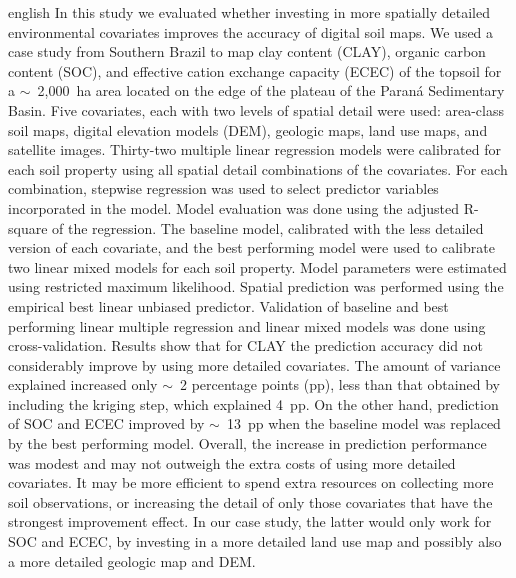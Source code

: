 \begin{chapterabstract}{english}{\englishkeys}
In this study we evaluated whether investing in more spatially detailed 
environmental covariates improves the accuracy of digital soil maps. We used a 
case study from Southern Brazil to map clay content (CLAY), organic carbon 
content (SOC), and effective cation exchange capacity (ECEC) of the topsoil for
a $\sim$~2,000~ha area located on the edge of the plateau of the Paraná 
Sedimentary Basin. Five covariates, each with two levels of spatial detail were
used: area-class soil maps, digital elevation models (DEM), geologic maps, land
use maps, and satellite images. Thirty-two multiple linear regression models 
were calibrated for each soil property using all spatial detail combinations of
the covariates. For each combination, stepwise regression was used to select 
predictor variables incorporated in the model. Model evaluation was done using 
the adjusted R-square of the regression. The baseline model, calibrated with the
less detailed version of each covariate, and the best performing model were used
to calibrate two linear mixed models for each soil property. Model parameters 
were estimated using restricted maximum likelihood. Spatial prediction was 
performed using the empirical best linear unbiased predictor. Validation of 
baseline and best performing linear multiple regression and linear mixed models
was done using cross-validation. Results show that for CLAY the prediction 
accuracy did not considerably improve by using more detailed covariates. The 
amount of variance explained increased only $\sim$~2 percentage points (pp), 
less than that obtained by including the kriging step, which explained 4~pp. On
the other hand, prediction of SOC and ECEC improved by $\sim$~13~pp when the 
baseline model was replaced by the best performing model. Overall, the increase
in prediction performance was modest and may not outweigh the extra costs of 
using more detailed covariates. It may be more efficient to spend extra 
resources on collecting more soil observations, or increasing the detail of only
those covariates that have the strongest improvement effect. In our case study,
the latter would only work for SOC and ECEC, by investing in a more detailed 
land use map and possibly also a more detailed geologic map and DEM.
\end{chapterabstract}

